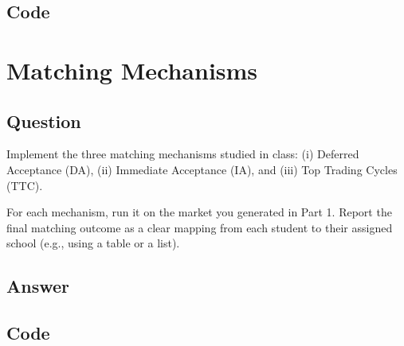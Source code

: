 \documentclass[12pt,oneside]{article}
\begin{document}
\subsection{Code}










\newpage
\section{Matching Mechanisms}
\subsection{Question}
Implement the three matching mechanisms studied in class: (i) Deferred Acceptance (DA), (ii) Immediate Acceptance (IA), and (iii) Top Trading Cycles (TTC).

For each mechanism, run it on the market you generated in Part 1. Report the final matching outcome as a clear mapping from each student to their assigned school (e.g., using a table or a list).
\subsection{Answer}




\newpage
\subsection{Code}










\newpage
\end{document}

